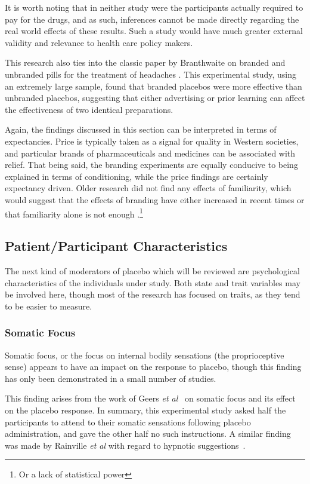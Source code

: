 It is worth noting that in neither study were the participants actually required to pay for the drugs, and as such, inferences cannot be made directly regarding the real world effects of these results. Such a study would have much greater external validity and relevance to health care policy makers. 

This research also ties into the classic paper by Branthwaite on branded and unbranded pills for the treatment of headaches \cite{Branthwaite1981}. This experimental study, using an extremely large sample, found that branded placebos were more effective than unbranded placebos, suggesting that either advertising or prior learning can affect the effectiveness of two identical preparations. 

Again, the findings discussed in this section can be interpreted in terms of  expectancies. Price is typically taken as a signal for quality in Western societies, and particular brands of pharmaceuticals and medicines can be associated with relief. That being said, the branding experiments are equally conducive to being explained in terms of conditioning, while the price findings are certainly expectancy driven. Older research did not find any effects of familiarity, which would suggest that the effects of branding have either increased  in recent times or that familiarity alone is not enough \cite{Morris1974}.\footnote{Or a lack of statistical power}


\subsection{Patient/Participant Characteristics}
\label{sec:psych-char}

The next  kind of moderators of placebo which will be reviewed are psychological characteristics of the individuals under study. Both state and trait variables may be involved here, though most of the research has focused on traits, as they tend to be easier to measure. 

\subsubsection{Somatic Focus}

Somatic focus, or the focus on internal bodily sensations (the proprioceptive sense) appears to have an impact on the response to placebo, though this finding has only been demonstrated in a small number of studies. 

This finding arises from the work of Geers \textit{et al}~\cite{Geers2006}  on somatic focus and its effect on the placebo response. In summary, this experimental study asked half the participants to attend to their somatic sensations following placebo administration, and gave the other half no such instructions. A similar finding was made by Rainville \textit{et al} with regard to hypnotic suggestions~\cite{Price2008}. 

